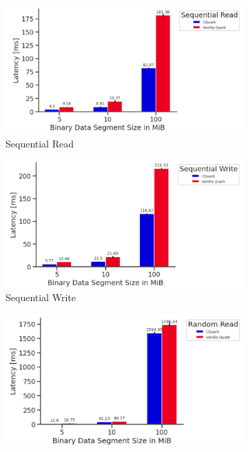 \begin{figure}[!htb] 
    \begin{subfigure}[b]{0.5\linewidth}
      \centering
      \includegraphics[width=0.9\linewidth]{images/Sequential_Read.PNG} 
      \caption{Sequential Read} 
      \label{fig7:a} 
      \vspace{4ex}
    \end{subfigure}%
    \begin{subfigure}[b]{0.5\linewidth}
      \centering
      \includegraphics[width=0.9\linewidth]{images/Sequential_Write.PNG} 
      \caption{Sequential Write} 
      \label{fig7:b} 
      \vspace{4ex}
    \end{subfigure} 
    \begin{subfigure}[b]{0.5\linewidth}
      \centering
      \includegraphics[width=0.9\linewidth]{images/Random_Read.PNG} 

\end{subfigure}
\end{figure}
